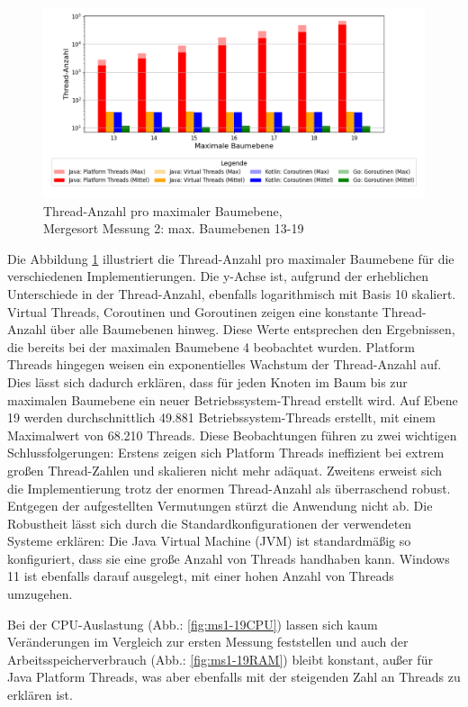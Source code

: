 \documentclass[fontsize=12pt,paper=a4,twoside=semi,parskip=half-,headsepline,headinclude]{scrreprt}
\begin{document}
\begin{figure}[H]
	\centering
	\includegraphics[scale=0.48]{figures/mergesort/Maximalebauebenen1-19_pvcg/num_threads_bar_plot.png}
	\caption{Thread-Anzahl pro maximaler Baumebene,\\ Mergesort Messung 2: max. Baumebenen 13-19}
	\label{fig:ms1-19Threads}
\end{figure}

Die Abbildung \ref{fig:ms1-19Threads} illustriert die Thread-Anzahl pro maximaler Baumebene für die verschiedenen Implementierungen. Die y-Achse ist, aufgrund der erheblichen Unterschiede in der Thread-Anzahl, ebenfalls logarithmisch mit Basis 10 skaliert. Virtual Threads, Coroutinen und Goroutinen zeigen eine konstante Thread-Anzahl über alle Baumebenen hinweg. Diese Werte entsprechen den Ergebnissen, die bereits bei der maximalen Baumebene 4 beobachtet wurden. Platform Threads hingegen weisen ein exponentielles Wachstum der Thread-Anzahl auf. Dies lässt sich dadurch erklären, dass für jeden Knoten im Baum bis zur maximalen Baumebene ein neuer Betriebssystem-Thread erstellt wird. Auf Ebene 19 werden durchschnittlich 49.881 Betriebssystem-Threads erstellt, mit einem Maximalwert von 68.210 Threads. Diese Beobachtungen führen zu zwei wichtigen Schlussfolgerungen: Erstens zeigen sich Platform Threads ineffizient bei extrem großen Thread-Zahlen und skalieren nicht mehr adäquat. Zweitens erweist sich die Implementierung trotz der enormen Thread-Anzahl als überraschend robust. Entgegen der aufgestellten Vermutungen stürzt die Anwendung nicht ab. Die Robustheit lässt sich durch die Standardkonfigurationen der verwendeten Systeme erklären: Die Java Virtual Machine (JVM) ist standardmäßig so konfiguriert, dass sie eine große Anzahl von Threads handhaben kann. Windows 11 ist ebenfalls darauf ausgelegt, mit einer hohen Anzahl von Threads umzugehen. 

Bei der CPU-Auslastung (Abb.: \ref{fig:ms1-19CPU}) lassen sich kaum Veränderungen im Vergleich zur ersten Messung feststellen und auch der Arbeitsspeicherverbrauch (Abb.: \ref{fig:ms1-19RAM}) bleibt konstant, außer für Java Platform Threads, was aber ebenfalls mit der steigenden Zahl an Threads zu erklären ist.
\end{document}
